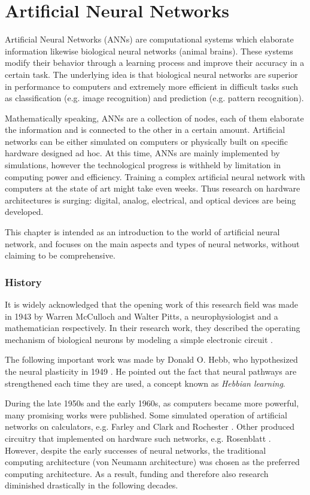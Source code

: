 \chapter{Artificial Neural Networks}
\label{ch:Artificial_Neural_Networks}

Artificial Neural Networks (ANNs) are computational systems which elaborate information likewise biological neural networks (animal brains).
These systems modify their behavior through a learning process and improve their accuracy in a certain task.
The underlying idea is that biological neural networks are superior in performance to computers and extremely more efficient in difficult tasks such as classification (e.g. image recognition) and prediction (e.g. pattern recognition).

Mathematically speaking, ANNs are a collection of nodes, each of them elaborate the information and is connected to the other in a certain amount.
Artificial networks can be either simulated on computers or physically built on specific hardware designed ad hoc.
At this time, ANNs are mainly implemented by simulations, however the technological progress is withheld by limitation in computing power and efficiency.
Training a complex artificial neural network with computers at the state of art might take even weeks.
Thus research on hardware architectures is surging: digital, analog, electrical, and optical devices are being developed.

This chapter is intended as an introduction to the world of artificial neural network, and focuses on the main aspects and types of neural networks, without claiming to be comprehensive.

\subsection{History}
\label{ssec:History}
It is widely acknowledged that the opening work of this research field was made in 1943 by Warren McCulloch and Walter Pitts, a neurophysiologist and a mathematician respectively.
In their research work, they described the operating mechanism of biological neurons by modeling a simple electronic circuit \cite{McCulloch1943}.

The following important work was made by Donald O. Hebb, who hypothesized the neural plasticity in 1949 \cite{hebb1949organization}.
He pointed out the fact that neural pathways are strengthened each time they are used, a concept known as \textit{Hebbian learning}.

During the late 1950s and the early 1960s, as computers became more powerful, many promising works were published.
Some simulated operation of artificial networks on calculators, e.g. Farley and Clark \cite{Farley1954} and Rochester \cite{Rochester1956}.
Other produced circuitry that implemented on hardware such networks, e.g. Rosenblatt \cite{frank1957perceptron,Rosenblatt1958}.
However, despite the early successes of neural networks, the traditional computing architecture (von Neumann architecture) was chosen as the preferred computing architecture.
As a result, funding and therefore also research diminished drastically in the following decades.

